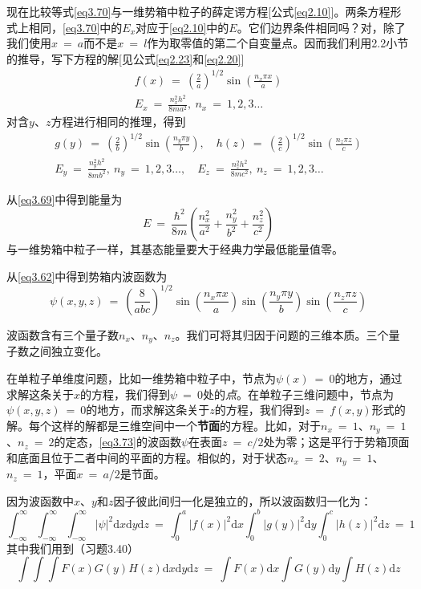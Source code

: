 \documentclass[12pt,a4paper,openany]{ctexbook}
\begin{document}
\begin{flushleft}
现在比较等式\eqref{eq3.70}与一维势箱中粒子的薛定谔方程[公式\eqref{eq2.10}]。两条方程形式上相同，\eqref{eq3.70}中的$E_x$对应于\eqref{eq2.10}中的$E$。它们边界条件相同吗？对，除了我们使用$x\ =\ a$而不是$x\ =\ l$作为取零值的第二个自变量点。因而我们利用2.2小节的推导，写下方程的解[见公式\eqref{eq2.23}和\eqref{eq2.20}]
\begin{gather*}
    f(x)\ =\ (\frac{2}{a})^{1/2}\sin(\frac{n_x\pi x}{a}) \\
    E_x\ =\ \frac{n_x^2h^2}{8ma^2},\ n_x\ =\ 1,2,3\dots
\end{gather*}
对含$y$、$z$方程进行相同的推理，得到
\begin{gather*}
    g(y)\ =\ (\frac{2}{b})^{1/2}\sin(\frac{n_y\pi y}{b}),\quad h(z)\ =\ (\frac{2}{c})^{1/2}\sin(\frac{n_z\pi z}{c}) \\
    E_y\ =\ \frac{n_y^2h^2}{8mb^2},\ n_y\ =\ 1,2,3\dots,\quad E_z\ =\ \frac{n_z^2h^2}{8mc^2},\ n_z\ =\ 1,2,3\dots
\end{gather*}

从\eqref{eq3.69}中得到能量为
\begin{equation}
    E\ =\ \frac{\hbar^2}{8m}(\frac{n_x^2}{a^2}+\frac{n_y^2}{b^2}+\frac{n_z^2}{c^2}) \label{eq3.72}
\end{equation}
与一维势箱中粒子一样，其基态能量要大于经典力学最低能量值零。

从\eqref{eq3.62}中得到势箱内波函数为
\begin{equation}
    \psi(x,y,z)\ =\ (\frac{8}{abc})^{1/2}\sin(\frac{n_x\pi x}{a})\sin(\frac{n_y\pi y}{b})\sin(\frac{n_z\pi z}{c}) \label{eq3.73}
\end{equation}

波函数含有三个量子数$n_x$、$n_y$、$n_z$。我们可将其归因于问题的三维本质。三个量子数之间独立变化。

在单粒子单维度问题，比如一维势箱中粒子中，节点为$\psi(x)\ =\ 0$的地方，通过求解这条关于$x$的方程，我们得到$\psi\ =\ 0$处的\textit{点}。在单粒子三维问题中，节点为$\psi(x,y,z)\ =\ 0$的地方，而求解这条关于$z$的方程，我们得到$z\ =\ f(x,y)$形式的解。每个这样的解都是三维空间中一个\textbf{节面}的方程。比如，对于$n_x\ =\ 1$、$n_y\ =\ 1$、$n_z\ =\ 2$的定态，\eqref{eq3.73}的波函数$\psi$在表面$z\ =\ c/2$处为零；这是平行于势箱顶面和底面且位于二者中间的平面的方程。相似的，对于状态$n_x\ =\ 2$、$n_y\ =\ 1$、$n_z\ =\ 1$，平面$x\ =\ a/2$是节面。

因为波函数中$x$、$y$和$z$因子彼此间归一化是独立的，所以波函数归一化为：
\begin{equation*}
    \int_{-\infty}^{\infty}\int_{-\infty}^{\infty}\int_{-\infty}^{\infty}\left|\psi\right|^2\mathrm{d}x\mathrm{d}y\mathrm{d}z\ =\ \int_0^a\left|f(x)\right|^2\mathrm{d}x\int_0^b\left|g(y)\right|^2\mathrm{d}y\int_0^c\left|h(z)\right|^2\mathrm{d}z\ =\ 1
\end{equation*}
其中我们用到（习题3.40）
\begin{equation}
    \boxed{\int\int\int F(x)G(y)H(z)\mathrm{d}x\mathrm{d}y\mathrm{d}z\ =\ \int F(x)\mathrm{d}x\int G(y)\mathrm{d}y\int H(z)\mathrm{d}z} \label{eq3.74}
\end{equation}


\end{flushleft}
\end{document}
